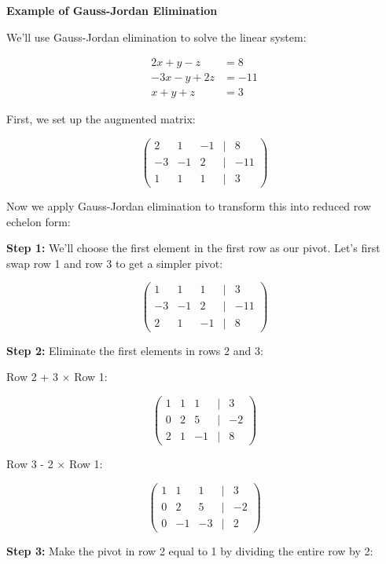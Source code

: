 \textbf{Example of Gauss-Jordan Elimination}
\vspace{\baselineskip}

We'll use Gauss-Jordan elimination to solve the linear system:

\begin{align*}
    2x + y - z &= 8 \\
    -3x - y + 2z &= -11 \\
    x + y + z &= 3
\end{align*}

First, we set up the augmented matrix:

\[
    \begin{pmatrix}
    2 & 1 & -1 & | & 8 \\
    -3 & -1 & 2 & | & -11 \\
    1 & 1 & 1 & | & 3
    \end{pmatrix}
\]

Now we apply Gauss-Jordan elimination to transform this into reduced row echelon form:
\vspace{\baselineskip}

\textbf{Step 1:} We'll choose the first element in the first row as our pivot. Let's first swap row 1 and row 3 to get a simpler pivot:

\[
    \begin{pmatrix}
    1 & 1 & 1 & | & 3 \\
    -3 & -1 & 2 & | & -11 \\
    2 & 1 & -1 & | & 8
    \end{pmatrix}
\]

\textbf{Step 2:} Eliminate the first elements in rows 2 and 3:

Row 2 + 3 \(\times\) Row 1:

\[
    \begin{pmatrix}
    1 & 1 & 1 & | & 3 \\
    0 & 2 & 5 & | & -2 \\
    2 & 1 & -1 & | & 8
    \end{pmatrix}
\]

Row 3 - 2 \(\times\) Row 1:

\[
    \begin{pmatrix}
    1 & 1 & 1 & | & 3 \\
    0 & 2 & 5 & | & -2 \\
    0 & -1 & -3 & | & 2
    \end{pmatrix}
\]

\textbf{Step 3:} Make the pivot in row 2 equal to 1 by dividing the entire row by 2:

